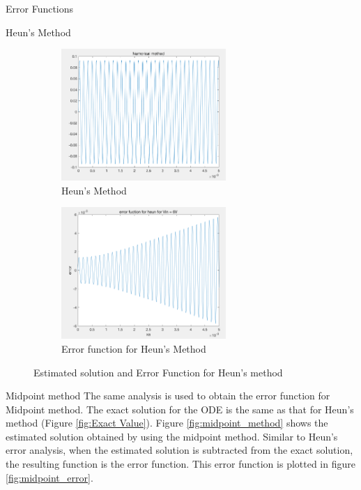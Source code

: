 \documentclass[10pt,a4paper]{article}
\begin{document}
\begin{subsection}{Error Functions}
\begin{subsection}{Heun's Method}
\begin{figure}[h]
\begin{subfigure}{.5\textwidth}
  \includegraphics[width=.9\linewidth,height = 5cm
  ]{heun_error_numerical_method}
  \caption[right]{Heun's Method}
  \label{fig:Heun Method}
\end{subfigure}
\begin{subfigure}{.5\textwidth}
  \includegraphics[width=.9\linewidth,height = 5cm]{heun_error}
  \caption{Error function for Heun's Method}
  \label{fig:heun_error}
\end{subfigure}
\caption{Estimated solution and Error Function for Heun's method}
\label{fig:Heun_Error_sub}
\end{figure}




\end{subsection}
\clearpage

\begin{subsection}{Midpoint method}
The same analysis is used to obtain the error function for Midpoint method. The exact solution for the ODE is the same as that for Heun's method (Figure \ref{fig:Exact Value}).  Figure \ref{fig:midpoint_method} shows the estimated solution obtained by using the midpoint method. Similar to Heun's error analysis, when the estimated solution is subtracted from the exact solution, the resulting function is the error function. This error function is plotted in figure \ref{fig:midpoint_error}.


\end{subsection}
\end{subsection}
\end{document}

